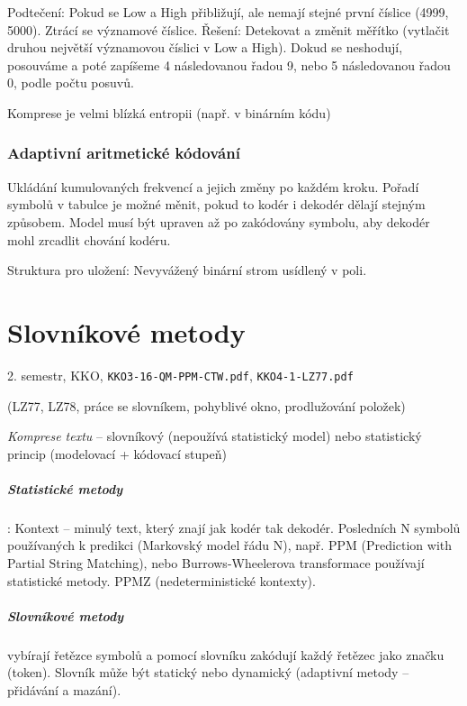 \documentclass[a4paper, 11pt]{report}
\begin{document}
Podtečení: Pokud se Low a High přibližují, ale nemají stejné první číslice (4999, 5000). Ztrácí se významové číslice. Řešení: Detekovat a změnit měřítko (vytlačit druhou největší významovou číslici v Low a High). Dokud se neshodují, posouváme a poté zapíšeme 4 následovanou řadou 9, nebo 5 následovanou řadou 0, podle počtu posuvů.

Komprese je velmi blízká entropii (např. v binárním kódu)

\subsection{Adaptivní aritmetické kódování}
Ukládání kumulovaných frekvencí a jejich změny po každém kroku. Pořadí symbolů v tabulce je možné měnit, pokud to kodér i dekodér dělají stejným způsobem. Model musí být upraven až po zakódovány symbolu, aby dekodér mohl zrcadlit chování kodéru.

Struktura pro uložení: Nevyvážený binární strom usídlený v poli.

\chapter{Slovníkové metody} \label{cha:36}
2. semestr, KKO, \texttt{KKO3-16-QM-PPM-CTW.pdf}, \texttt{KKO4-1-LZ77.pdf}

(LZ77, LZ78, práce se slovníkem, pohyblivé okno, prodlužování položek)
 
\emph{Komprese textu} -- slovníkový (nepoužívá statistický model) nebo statistický princip (modelovací + kódovací stupeň)

\paragraph{Statistické metody}:
Kontext -- minulý text, který znají jak kodér tak dekodér. Posledních N symbolů používaných k predikci (Markovský model řádu N), např. PPM (Prediction with Partial String Matching), nebo Burrows-Wheelerova transformace používají statistické metody. PPMZ (nedeterministické kontexty).

\paragraph{Slovníkové metody} vybírají řetězce symbolů a pomocí slovníku zakódují každý řetězec jako značku (token). Slovník může být statický nebo dynamický (adaptivní metody -- přidávání a mazání).
\end{document}
